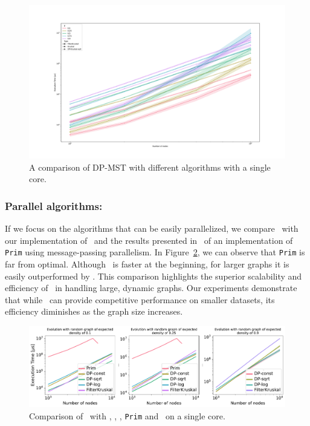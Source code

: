         \begin{figure}
        \begin{center}
            \includegraphics[width=\textwidth]{figures/Others.pdf}
        \end{center}
        \caption{A comparison of DP-MST with different algorithms with a single core.}
        \label{fig:others_algorithms}
        \end{figure}

    
        \subsubsection*{Parallel algorithms:}
        
        If we focus on the algorithms that can be easily parallelized, we compare \DPmst\ with our implementation of \FKruskal\ and the results presented in~\cite{Lonar2014} of an implementation of {\tt Prim} using message-passing parallelism. In Figure~\ref{fig:static:multiples}, we can observe that {\tt Prim} is far from optimal. Although \FKruskal\ is faster at the beginning, for larger graphs it is easily outperformed by \DPmst. This comparison highlights the superior scalability and efficiency of \DPmst\ in handling large, dynamic graphs. Our experiments demonstrate that while \FKruskal\ can provide competitive performance on smaller datasets, its efficiency diminishes as the graph size increases. 

        \begin{figure}
            \centering
            \includegraphics[width=1\linewidth]{figures/SomeDensities_mixed.pdf}
            \caption{\label{fig:dpmst-versions}Comparison of \DPmst\ with , , , {\tt Prim} and \FKruskal\ on a single core.}
            \label{fig:static:multiples}
        \end{figure}
        
